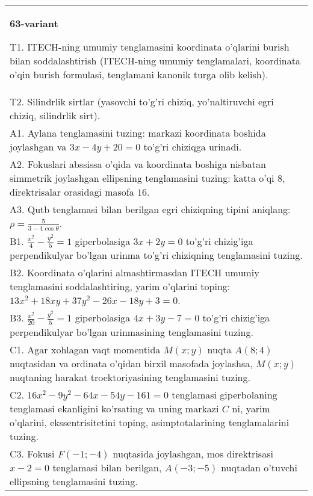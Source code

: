 \documentclass{article}
\begin{document}
\begin{tabular}{m{17cm}}
\textbf{63-variant}
\newline

T1. ITECH-ning umumiy tenglamasini koordinata o'qlarini burish bilan soddalashtirish (ITECH-ning umumiy tenglamalari, koordinata o'qin burish formulasi, tenglamani kanonik turga olib kelish).\\

T2. Silindrlik sirtlar (yasovchi to'g'ri chiziq, yo'naltiruvchi egri chiziq, silindrlik sirt).\\

A1. Aylana tenglamasini tuzing: markazi koordinata boshida joylashgan va $3x-4y+20=0$ to'g'ri chiziqga urinadi.\\

A2. Fokuslari abssissa o'qida va koordinata boshiga nisbatan simmetrik joylashgan ellipsning tenglamasini tuzing: katta o'qi $8$, direktrisalar orasidagi masofa $16$.\\

A3. Qutb tenglamasi bilan berilgan egri chiziqning tipini aniqlang: $\rho=\frac{5}{3-4\cos\theta}$.\\

B1. $\frac{x^{2}}{4} - \frac{y^{2}}{5} = 1$ giperbolasiga $3x + 2y = 0$ to'g'ri chizig'iga perpendikulyar bo'lgan urinma to'g'ri chiziqning tenglamasini tuzing.\\

B2. Koordinata o'qlarini almashtirmasdan ITECH umumiy tenglamasini soddalashtiring, yarim o'qlarini toping: $13x^{2} + 18xy + 37y^{2} - 26x - 18y + 3 = 0$.  \\

B3. $\frac{x^{2}}{20} - \frac{y^{2}}{5} = 1$ giperbolasiga $4x + 3y - 7 = 0$ to'g'ri chizig'iga perpendikulyar bo'lgan urinmasining tenglamasini tuzing.  \\

C1. Agar xohlagan vaqt momentida $M(x;y)$ nuqta $A(8;4)$ nuqtasidan va ordinata o'qidan birxil masofada joylashsa, $M(x;y)$ nuqtaning harakat troektoriyasining tenglamasini tuzing.  \\

C2. $16x^{2} - 9y^{2} - 64x - 54y - 161 = 0$ tenglamasi giperbolaning tenglamasi ekanligini ko'rsating va uning markazi $C$ ni, yarim o'qlarini, ekssentrisitetini toping, asimptotalarining tenglamalarini tuzing.  \\

C3. Fokusi $F( - 1; - 4)$ nuqtasida joylashgan, mos direktrisasi $x - 2 = 0$ tenglamasi bilan berilgan, $A( - 3; - 5)$ nuqtadan o'tuvchi ellipsning tenglamasini tuzing.  \\

\end{tabular}
\vspace{1cm}
\end{document}
